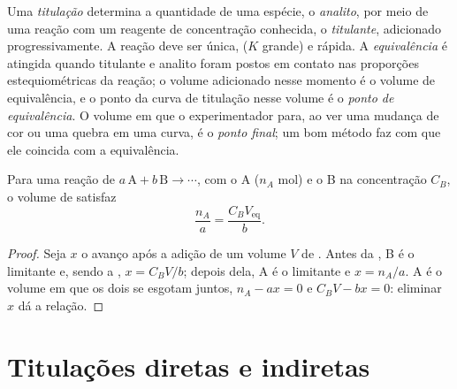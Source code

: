 \begin{definition}\label{def:b1:titration-methods:titration}
Uma \emph{titulação} determina a quantidade de uma espécie,
o \emph{analito}, por meio de uma reação com um reagente
de concentração conhecida, o \emph{titulante},
adicionado progressivamente. A reação deve ser única,  ($K$
grande) e rápida. A \emph{equivalência} é atingida
quando titulante e analito foram postos em contato nas proporções
estequiométricas da reação; o volume adicionado nesse momento é o
volume de equivalência, e o ponto da curva de titulação nesse volume é
o \emph{ponto de equivalência}. O volume em
que o experimentador para, ao ver uma mudança de cor ou uma quebra em
uma curva, é o \emph{ponto final}; um bom método faz
com que ele coincida com a equivalência.
\end{definition}

\begin{proposition}\label{prop:b1:titration-methods:equivalence}
Para uma reação de  $a\,\mathrm{A} + b\,\mathrm{B} \to \cdots$,
com o  A ($n_A$ mol) e o  B na concentração $C_B$, o
volume de  satisfaz
\[
  \frac{n_A}{a} = \frac{C_B V_{\mathrm{eq}}}{b} .
\]
\end{proposition}

\begin{proof}
Seja $x$ o avanço após a adição de um volume $V$ de . Antes da
, B é o limitante e, sendo a ,
$x = C_BV/b$; depois dela, A é o limitante e $x = n_A/a$. A 
é o volume em que os dois se esgotam juntos, $n_A - ax = 0$ e
$C_BV - bx = 0$: eliminar $x$ dá a relação.
\end{proof}

\section{Titulações diretas e indiretas}

